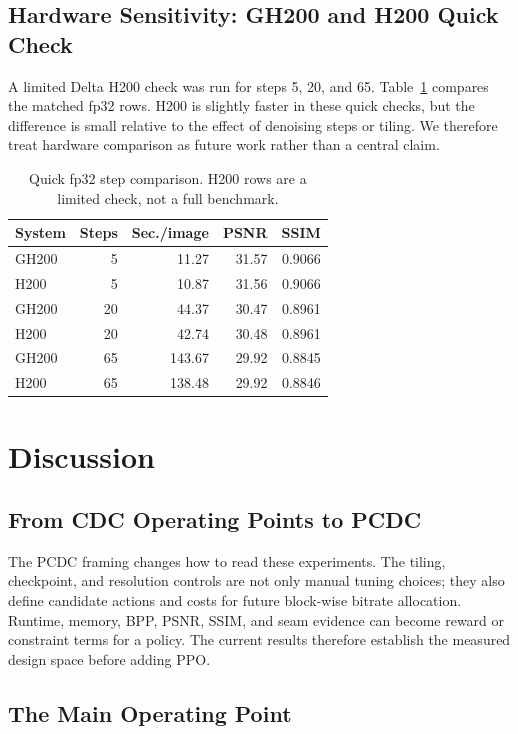 \documentclass[conference]{IEEEtran}
\begin{document}
\subsection{Hardware Sensitivity: GH200 and H200 Quick Check}

A limited Delta H200 check was run for steps 5, 20, and 65. Table~\ref{tab:h200} compares the matched fp32 rows. H200 is slightly faster in these quick checks, but the difference is small relative to the effect of denoising steps or tiling. We therefore treat hardware comparison as future work rather than a central claim.

\begin{table}[t]
\caption{Quick fp32 step comparison. H200 rows are a limited check, not a full benchmark.}
\label{tab:h200}
\centering
\begin{tabular}{lrrrr}
\toprule
System & Steps & Sec./image & PSNR & SSIM\\
\midrule
GH200 & 5 & 11.27 & 31.57 & 0.9066\\
H200 & 5 & 10.87 & 31.56 & 0.9066\\
GH200 & 20 & 44.37 & 30.47 & 0.8961\\
H200 & 20 & 42.74 & 30.48 & 0.8961\\
GH200 & 65 & 143.67 & 29.92 & 0.8845\\
H200 & 65 & 138.48 & 29.92 & 0.8846\\
\bottomrule
\end{tabular}
\end{table}

\section{Discussion}

\subsection{From CDC Operating Points to PCDC}

The PCDC framing changes how to read these experiments. The tiling, checkpoint, and resolution controls are not only manual tuning choices; they also define candidate actions and costs for future block-wise bitrate allocation. Runtime, memory, BPP, PSNR, SSIM, and seam evidence can become reward or constraint terms for a policy. The current results therefore establish the measured design space before adding PPO.

\subsection{The Main Operating Point}
\end{document}
